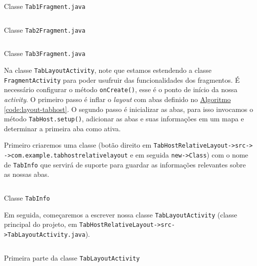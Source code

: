 \documentclass[a4paper,12pt,brazil,oneside]{book}
\begin{document}
	\begin{listing}[H]
	\inputminted[linenos=true,fontsize=\small,frame=lines, framesep=2mm, tabsize=2,numbersep=5pt]{java}{src/design/tab1-frag.java}
	\caption{Classe \texttt{Tab1Fragment.java}}
	\label{code:tab1frag}
	\end{listing}
	
	\begin{listing}[H]
	\inputminted[linenos=true,fontsize=\small,frame=lines, framesep=2mm, tabsize=2,numbersep=5pt]{java}{src/design/tab2-frag.java}
	\caption{Classe \texttt{Tab2Fragment.java}}
	\label{code:tab2frag}
	\end{listing}
	
	\begin{listing}[H]
	\inputminted[linenos=true,fontsize=\small,frame=lines, framesep=2mm, tabsize=2,numbersep=5pt]{java}{src/design/tab3-frag.java}
	\caption{Classe \texttt{Tab3Fragment.java}}
	\label{code:tab3frag}
	\end{listing}
	
	Na classe \texttt{TabLayoutActivity}, note que estamos estendendo a classe \texttt{FragmentActivity} para poder usufruir das funcionalidades dos fragmentos. É necessário configurar o método \texttt{onCreate()}, esse é o ponto de início da nossa \emph{activity}. O primeiro passo é inflar o \emph{layout} com abas definido no \hyperref[code:layout-tabhost]{Algoritmo \ref*{code:layout-tabhost}}. O segundo passo é inicializar as abas, para isso invocamos o método \texttt{TabHost.setup()}, adicionar as abas e suas informações em um mapa e determinar a primeira aba como ativa.
	
	Primeiro criaremos uma classe (botão direito em 
	\texttt{TabHostRelativeLayout->src->} \texttt{->com.example.tabhostrelativelayout} e em seguida \texttt{new->Class}) com o nome de \texttt{TabInfo} que servirá de suporte para guardar as informações relevantes sobre as nossas abas.
	
	\begin{listing}[H]
	\inputminted[linenos=true,fontsize=\small,frame=lines, framesep=2mm, tabsize=2,numbersep=5pt]{java}{src/design/tabinfo.java}
	\caption{Classe \texttt{TabInfo}}
	\end{listing}
	
	Em seguida, começaremos a escrever nossa classe \texttt{TabLayoutActivity} (classe principal do projeto, em \texttt{TabHostRelativeLayout->src->TabLayoutActivity.java}).
	
 	\begin{listing}[H]
	\inputminted[linenos=true,fontsize=\small,frame=lines, framesep=2mm, tabsize=2,numbersep=5pt]{java}{src/design/tab-activity1.java}
	\caption{Primeira parte da classe \texttt{TabLayoutActivity}}
	\end{listing}
	
\end{document}
